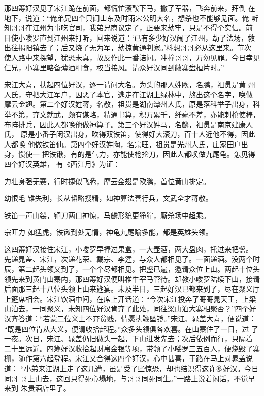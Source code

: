 那四筹好汉见了宋江跪在前面，都慌忙滚鞍下马，撇了军器，飞奔前来，拜倒
在地下，说道：“俺弟兄四个只闻山东及时雨宋公明大名，想杀也不能够见面。俺
听知哥哥在江州为事吃官司，我弟兄商议定了，正要来劫牢，只是不得个实信。前
日使小喽罗直到江州来打听，回来说道：‘已有多少好汉闹了江州，劫了法场，救
出往揭阳镇去了；后又烧了无为军，劫掠黄通判家。’料想哥哥必从这里来。节次
使人路中来探望，犹恐未真，故反作此一番诘问。冲撞哥哥，万勿见罪。今日幸见
仁兄，小寨里略备薄酒粗食，权当接风。请众好汉同到敝寨盘桓片时。”

宋江大喜，扶起四位好汉，逐一请问大名。为头的那人姓欧，名鹏，祖贯是黄
州人氏，守把大江军户，因恶了本官，逃走在江湖上绿林中，熬出这个名字，唤做
摩云金翅。第二个好汉姓蒋，名敬，祖贯是湖南潭州人氏，原是落科举子出身，科
举不第，弃文就武，颇有谋略，精通书算，积万累千，纤毫不差，亦能刺枪使棒，
布阵排兵，因此人都唤他做神算子。第三个好汉姓马，名麟，祖贯是南京建康人氏，
原是小番子闲汉出身，吹得双铁笛，使得好大滚刀，百十人近他不得，因此人都唤
他做铁笛仙。第四个好汉姓陶，名宗旺，祖贯是光州人氏，庄家田户出身，惯使一
把铁锹，有的是气力，亦能使枪抡刀，因此人都唤做九尾龟。怎见得四个好汉英雄，
有《西江月》为证：

力壮身强无赛，行时捷似飞腾，摩云金翅是欧鹏，首位黄山排定。

幼恨毛
锥失利，长从韬略搜精，如神算法善行兵，文武全才蒋敬。

铁笛一声山裂，铜刀两口神惊，马麟形貌更狰狞，厮杀场中超乘。

宗旺力
如猛虎，铁锹到处无情，神龟九尾喻多能，都是英雄头领。

这四筹好汉接住宋江，小喽罗早捧过果盒，一大壶酒，两大盘肉，托过来把盏。
先递晁盖、宋江，次递花荣、戴宗、李逵，与众人都相见了。一面递酒。没两个时
辰，第二起头领又到了，一个个尽都相见。把盏已遍，邀请众位上山。两起十位头
领先来到黄门山寨内，那四筹好汉便叫椎牛宰马管待。却教小喽罗陆续下山，接请
后面那三起十八位头领上山来筵宴。未及半日，三起好汉已都来到了，尽在聚义厅
上筵席相会。宋江饮酒中间，在席上开话道：“今次宋江投奔了哥哥晁天王，上梁
山泊去，一同聚义，未知四位好汉肯弃了此处，同往梁山泊大寨相聚否？”四个好
汉齐答道：“若蒙二位义士不弃贫贱，情愿执鞭坠镫。”宋江、晁盖大喜，便说道：
“既是四位肯从大义，便请收拾起程。”众多头领俱各欢喜。在山寨住了一日，过
了一夜。次日，宋江、晁盖仍旧做头一起，下山进发先去；次后依例而行，只隔着
二十里远近。四筹好汉收拾起财帛金银等项，带领了小喽罗三五百人，便烧毁了寨
栅，随作第六起登程。宋江又合得这四个好汉，心中甚喜，于路在马上对晁盖说道：
“小弟来江湖上走了这几遭，虽是受了些惊恐，却也结识得这许多好汉。今日同哥
哥上山去，这回只得死心塌地，与哥哥同死同生。”一路上说着闲话，不觉早来到
朱贵酒店里了。

